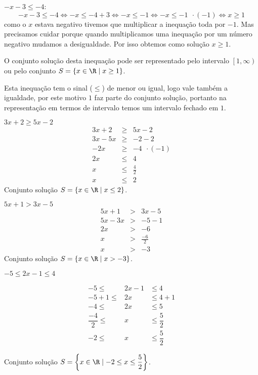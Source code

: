  \begin{exem} 
 $-x-3 \leq -4$:
\begin{equation}
-x-3 \leq -4 \Leftrightarrow -x \leq -4 + 3 \Leftrightarrow -x \leq -1 \Leftrightarrow -x \leq -1 \ \ \cdot (-1) \Leftrightarrow x \geq 1 
\end{equation}
 como o $x$ estava negativo tivemos que multiplicar a inequação toda por $-1$. Mas precisamos cuidar porque quando multiplicamos uma inequação por um número negativo mudamos a desigualdade. Por isso obtemos como solução $x \geq 1$.
 
  O conjunto solução desta inequação pode ser representado pelo intervalo $\left[1, \infty \right)$ ou pelo conjunto $S=\{x \in \R \mid x \geq 1\}$. 
  
  Esta inequação tem o sinal ($\leq$) de menor ou igual, logo vale também a igualdade, por este motivo $1$ faz parte do conjunto solução, portanto na representação em termos de intervalo temos um intervalo fechado em $1$.
 \end{exem}
 
 \begin{exem} 
 $3x+2 \geq 5x-2$
 \begin{eqnarray*}
 3x+2 & \geq & 5x-2 \\
 3x - 5x & \geq & -2-2 \\
 -2x & \geq & -4 \ \ \cdot (-1) \\
 2x & \leq & 4 \\
 x & \leq & \frac{4}{2} \\
 x & \leq & 2
 \end{eqnarray*}
 Conjunto solução $S=\{x \in \R \mid x \leq 2\}$.
 \end{exem}
 
  \begin{exem} 
  $5x +1 > 3x - 5$
  \begin{eqnarray*}
  5x +1 &>& 3x - 5 \\
  5x - 3x &>& -5 - 1 \\
  2x &>& -6 \\
  x &>& \frac{-6}{2} \\
  x &>& -3
  \end{eqnarray*}
  Conjunto solução $S=\{x \in \R \mid x > -3\}$.
 \end{exem}
 
  \begin{exem} 
  $-5 \leq 2x - 1 \leq 4$
   
   \begin{eqnarray*}
    -5  \leq  & 2x - 1 & \leq  4 \\
  -5 + 1 \leq & 2x & \leq 4 + 1 \\
  -4 \leq & 2x & \leq 5 \\
   \dfrac{-4}{2} \leq & x & \leq \dfrac{5}{2} \\
  -2 \leq & x &  \leq \dfrac{5}{2} 
   \end{eqnarray*}
      
  Conjunto solução $S= \left\{x \in \R \mid -2 \leq x \leq \dfrac{5}{2} \right\}$.
 \end{exem}
 
